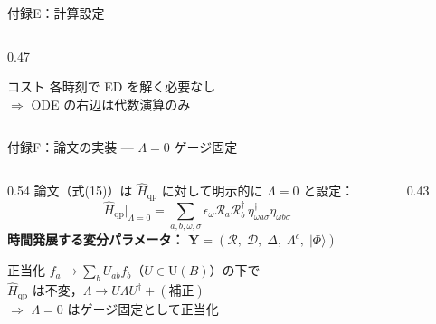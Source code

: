 \documentclass[12pt,aspectratio=169]{beamer}
\begin{document}
\begin{frame}[shrink=8]{付録E：計算設定}
\begin{columns}[T]
\begin{column}{0.47\textwidth}
      \begin{alertblock}{\footnotesize コスト}
        \footnotesize
        各時刻で ED を解く必要なし\\
        $\Rightarrow$ ODE の右辺は代数演算のみ
      \end{alertblock}
    \end{column}
  \end{columns}
\end{frame}

\begin{frame}{付録F：論文の実装 — $\Lambda=0$ ゲージ固定}
  \begin{columns}[T]
    \begin{column}{0.54\textwidth}
      論文（式(15)）は $\hat{H}_\mathrm{qp}$ に対して明示的に $\Lambda=0$ と設定：
      \begin{equation*}
        \hat{H}_\mathrm{qp}\big|_{\Lambda=0}
          =\sum_{a,b,\omega,\sigma}
            \epsilon_\omega\mathcal{R}_a\mathcal{R}_b^\dagger\,
            \eta^\dagger_{\omega a\sigma}\eta_{\omega b\sigma}
      \end{equation*}
      \textbf{時間発展する変分パラメータ：}
      $\mathbf{Y}=(\mathcal{R},\;\mathcal{D},\;\Delta,\;\Lambda^c,\;|\Phi\rangle)$

      \medskip
      \begin{block}{\small 正当化}
        \small $f_a\to\sum_b U_{ab}f_b$（$U\in\mathrm{U}(B)$）の下で\\
        $\hat{H}_\mathrm{qp}$ は不変，$\Lambda\to U\Lambda U^\dagger+(\text{補正})$\\
        $\Rightarrow$ $\Lambda=0$ はゲージ固定として正当化
      \end{block}
    \end{column}

    \begin{column}{0.43\textwidth}
    \end{column}
  \end{columns}
\end{frame}
\end{document}
